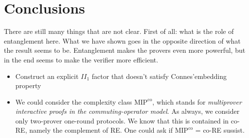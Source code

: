 \section*{Conclusions}

There are still many things that are not clear. First of all: what is the role of entanglement here. What we have shown goes in the opposite direction of what the result seems to be. Entanglement makes the provers even more powerful, but in the end seems to make the verifier more efficient.
\begin{itemize}

    \item Construct an explicit $II_1$ factor that doesn't satisfy Connes'embedding property
    \item We could consider the complexity class $\text{MIP}^\text{co}$, which stands for \emph{multiprover interactive proofs in the commuting-operator model}. As always, we consider only two-prover one-round protocols. We know that this is contained in co-RE, namely the complement of RE. One could ask if $\text{MIP}^\text{co}$ = co-RE sussist.
    
\end{itemize}